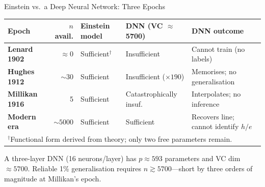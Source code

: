 \documentclass[aspectratio=169,12pt]{beamer}
\begin{document}
\begin{frame}[shrink=12]{Einstein vs.\ a Deep Neural Network: Three Epochs}

\begin{center}
\small
\renewcommand{\arraystretch}{1.2}
\begin{tabular}{p{2.8cm}rp{2.8cm}p{2.8cm}p{3.5cm}}
\toprule
Epoch & $n$ avail. & Einstein model & DNN (VC $\approx$ 5700) & DNN outcome \\
\midrule
\textbf{Lenard 1902}   & $\approx 0$  & Sufficient$^\dagger$ & Insufficient
  & Cannot train (no labels) \\[2pt]
\textbf{Hughes 1912}   & $\sim 30$    & Sufficient
  & Insufficient ($\times 190$) & Memorises; no generalisation \\[2pt]
\textbf{Millikan 1916} & 5            & Sufficient
  & Catastrophically insuf. & Interpolates; no inference \\[2pt]
\textbf{Modern era}    & $\sim 5000$  & Sufficient
  & Sufficient & Recovers line; cannot identify $h/e$ \\
\bottomrule
\multicolumn{5}{p{14.5cm}}{\small $^\dagger$Functional form derived from theory; only two free parameters remain.}
\end{tabular}
\end{center}

\bigskip
\small A three-layer DNN (16 neurons/layer) has $p \approx 593$ parameters and
VC dim $\approx 5700$.  Reliable 1\% generalisation requires $n \gtrsim 5700$---short by
three orders of magnitude at Millikan's epoch.

\end{frame}
\end{document}

